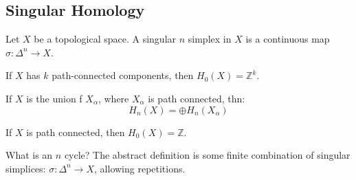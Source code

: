 \documentclass{book}                                                           %
\begin{document}
                \subsection{Singular Homology}
                    Let $X$ be a topological space. A
                    singular $n$ simplex in $X$ is a continuous map
                    $\sigma:\Delta^{n}\rightarrow{X}$.
                    \begin{theorem}
                        If $X$ has $k$ path-connected components, then
                        $H_{0}(X)=\mathbb{Z}^{k}$.
                    \end{theorem}
                    \begin{theorem}
                        If $X$ is the union f $X_{\alpha}$, where
                        $X_{\alpha}$ is path connected, thn:
                        \begin{equation}
                            H_{n}(X)=\oplus{H}_{n}(X_{\alpha})
                        \end{equation}
                    \end{theorem}
                    \begin{theorem}
                        If $X$ is path connected, then
                        $H_{0}(X)=\mathbb{Z}$.
                    \end{theorem}
                    What is an $n$ cycle? The abstract definition
                    is some finite combination of singular simplices:
                    $\sigma:\Delta^{n}\rightarrow{X}$, allowing
                    repetitions.
\end{document}
